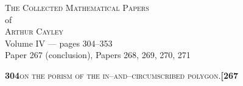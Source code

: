 \documentclass[11pt]{article}
\begin{document}
\thispagestyle{empty}
\begin{center}
\vspace*{2cm}
{\Large\scshape The Collected Mathematical Papers}\\[0.4em]
{\large of}\\[0.4em]
{\Large\scshape Arthur Cayley}\\[1.5em]
{\large Volume IV --- pages 304--353}\\[0.6em]
{\normalsize Paper 267 (conclusion), Papers 268, 269, 270, 271}\\[2em]
\vfill
\end{center}
\newpage

\setcounter{page}{304}


\noindent\textbf{304}\hfill\textsc{on the porism of the in--and--circumscribed polygon.}\hfill\textbf{[267}

\medskip
\end{document}
